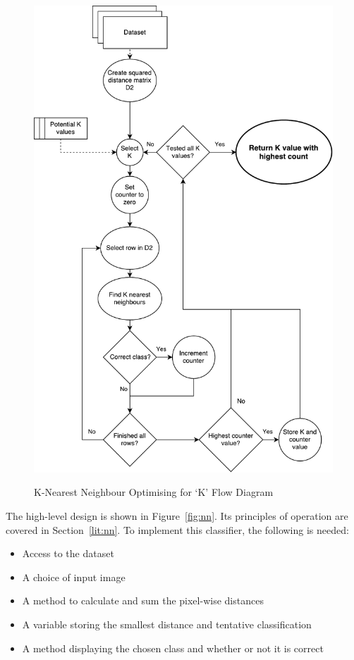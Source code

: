 \begin{figure}
	\centering
	\includegraphics[width=\textwidth]{figures/k_values}
	\label{fig:knn_values}
	\caption{K-Nearest Neighbour Optimising for `K' Flow Diagram}
	\centering
\end{figure}



The high-level design is shown in Figure~\ref{fig:nn}. Its principles of operation are covered in Section~\ref{lit:nn}. To implement this classifier, the following is needed:

\begin{itemize}
	\item Access to the dataset
	\item A choice of input image
	\item A method to calculate and sum the pixel-wise distances
	\item A variable storing the smallest distance and tentative classification
	\item A method displaying the chosen class and whether or not it is correct
\end{itemize}

